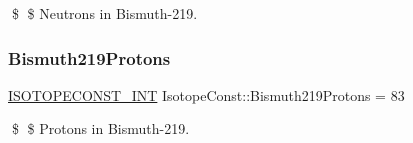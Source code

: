 \$ \$ Neutrons in Bismuth-\/219. \mbox{\label{group___isotope_const-_bismuth-_bi219_gac5573c95791c508ff37de41ff698b431}} 
\subsubsection{\texorpdfstring{Bismuth219\+Protons}{Bismuth219Protons}}
{\footnotesize\ttfamily \mbox{\hyperlink{group___isotope_const-_macros_ga5f18360b3e99483a35c32d789e62621c}{I\+S\+O\+T\+O\+P\+E\+C\+O\+N\+S\+T\+\_\+\+I\+NT}} Isotope\+Const\+::\+Bismuth219\+Protons = 83}

\$ \$ Protons in Bismuth-\/219. 